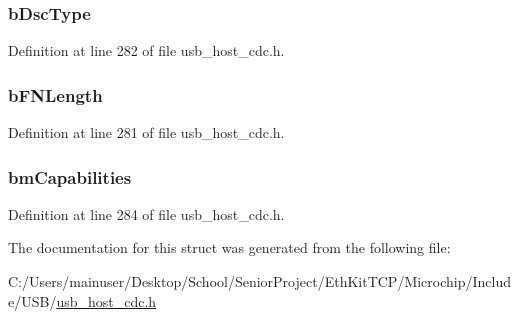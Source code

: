 \subsubsection[{b\+Dsc\+Type}]{ b\+Dsc\+Type}\label{struct___u_s_b___c_d_c___c_a_l_l___m_g_t___f_n___d_s_c_a3641ecfd04e86c3ce95c6bed0c066a5d}


Definition at line 282 of file usb\+\_\+host\+\_\+cdc.\+h.

\hypertarget{struct___u_s_b___c_d_c___c_a_l_l___m_g_t___f_n___d_s_c_a5cba7e463fbde92bb6daf4547a127a28}{}
\subsubsection[{b\+F\+N\+Length}]{ b\+F\+N\+Length}\label{struct___u_s_b___c_d_c___c_a_l_l___m_g_t___f_n___d_s_c_a5cba7e463fbde92bb6daf4547a127a28}


Definition at line 281 of file usb\+\_\+host\+\_\+cdc.\+h.

\hypertarget{struct___u_s_b___c_d_c___c_a_l_l___m_g_t___f_n___d_s_c_af373a8904dc7eab3ba5d57c69a7bbe01}{}
\subsubsection[{bm\+Capabilities}]{ bm\+Capabilities}\label{struct___u_s_b___c_d_c___c_a_l_l___m_g_t___f_n___d_s_c_af373a8904dc7eab3ba5d57c69a7bbe01}


Definition at line 284 of file usb\+\_\+host\+\_\+cdc.\+h.



The documentation for this struct was generated from the following file\+:\begin{DoxyCompactItemize}
\item 
C\+:/\+Users/mainuser/\+Desktop/\+School/\+Senior\+Project/\+Eth\+Kit\+T\+C\+P/\+Microchip/\+Include/\+U\+S\+B/\hyperlink{usb__host__cdc_8h}{usb\+\_\+host\+\_\+cdc.\+h}\end{DoxyCompactItemize}
